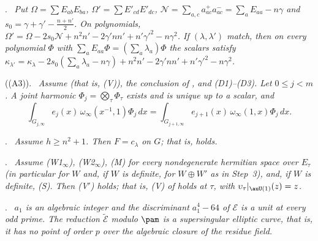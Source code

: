 \documentclass[10pt]{amsart}
\theoremstyle{definition}
\theoremstyle{remark}
\newenvironment{quotedthm}[2]{\par\medskip\noindent\begingroup
  \textbf{#1}#2.\ \itshape\ignorespaces}{\endgroup\par\medskip}
\begin{document}
\begin{quotedthm}{\cite[Lemma~3.14]{P49}}{}
Put $\Omega=\sum E_{ab}E_{ba}$, $\Omega'=\sum E'_{cd}E'_{dc}$, $\mathcal N=\sum_{a,c}a^+_{ac}a^-_{ac}=
\sum_aE_{aa}-n\gamma$ and $s_0=\gamma+\gamma'-\tfrac{n+n'}2$. On polynomials,
$\Omega'=\Omega-2s_0\mathcal N+n^2n'-2\gamma'nn'+n'\gamma'^2-n\gamma^2$. If $(\lambda,\lambda')$ match,
then on every polynomial $\Phi$ with $\sum_aE_{aa}\Phi=(\sum_a\lambda_a)\Phi$ the scalars satisfy
$\kappa_{\lambda'}=\kappa_\lambda-2s_0(\sum_a\lambda_a-n\gamma)+n^2n'-2\gamma'nn'+n'\gamma'^2-n\gamma^2$.
\end{quotedthm}

\begin{quotedthm}{\cite[Theorem~3.15]{P49}}{ ((A3))}
Assume {\cite[Lemma~3.6]{P49}} (that is, (V)), the conclusion of {\cite[Theorem~3.2]{P49}}, and
\textup{(D1)--(D3)}. Let $0\le j<m$. A joint harmonic $\Phi_j=\bigotimes_\tau\Phi_\tau$ exists and is
unique up to a scalar, and
\[
\int_{G_{j,\infty}}e_j(x)\,\omega_\infty(x^{-1},1)\Phi_j\,dx=\int_{G_{j+1,\infty}}e_{j+1}(x)\,\omega_\infty(1,x)
\Phi_j\,dx .
\]
\end{quotedthm}

\begin{quotedthm}{\cite[Theorem~3.17]{P49}}{}
Assume $h\ge n^2+1$. Then $F=c_\lambda$ on $G$; that is, {\cite[(59)]{P51}} holds.
\end{quotedthm}

\begin{quotedthm}{\cite[Theorem~3.29]{P49}}{}
Assume \textup{(W1$_\infty$)}, \textup{(W2$_\infty$)}, \textup{(M)} for every nondegenerate hermitian
space over $E_\tau$ (in particular for $W$ and, if $W$ is definite, for $W\oplus W'$ as in Step~3),
and, if $W$ is definite, \textup{(S)}. Then \textup{(V$'$)} holds; that is, \textup{(V)} of {\cite[Lemma~3.6]{P49}} holds at
$\tau$, with $\upsilon_\tau|_{\auU(1)}(z)=z$.
\end{quotedthm}

\begin{quotedthm}{\cite[Lemma~4.5]{P49}}{}
$a_1$ is an algebraic integer and the discriminant $a_1^4-64$ of $\mathcal E$ is a unit at every
odd prime. The reduction $\widetilde{\mathcal E}$ modulo $\pam$ is a supersingular elliptic curve,
that is, it has no point of order $p$ over the algebraic closure of the residue field.
\end{quotedthm}
\end{document}
